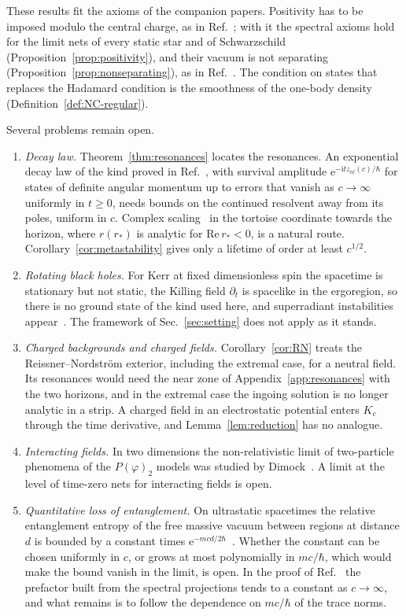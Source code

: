 \documentclass[%
 aip,
 jmp,
 amsmath,amssymb,
 reprint, onecolumn
]{revtex4-1}
\theoremstyle{definition}
\theoremstyle{remark}
\newcommand{\rmi}{\mathrm{i}}
\newcommand{\rme}{\mathrm{e}}
\begin{document}
These results fit the axioms of the companion papers. Positivity has to
be imposed modulo the central charge, as in
Ref.~;
with it the spectral axioms hold for the limit nets of every static
star and of Schwarzschild (Proposition~\ref{prop:positivity}), and their
vacuum is not separating (Proposition~\ref{prop:nonseparating}), as in
Ref.~. The
condition on states that replaces the Hadamard condition is the
smoothness of the one-body density (Definition~\ref{def:NC-regular}).

Several problems remain open.
\begin{enumerate}
\item \emph{Decay law.} Theorem~\ref{thm:resonances} locates the
resonances. An exponential decay law of the kind proved in
Ref.~, with survival amplitude
$\rme^{-\rmi tz_{nl}(c)/\hbar}$ for states of definite angular momentum up
to errors that vanish as $c\to\infty$ uniformly in $t\geq0$, needs bounds
on the continued resolvent away from its poles, uniform in $c$. Complex
scaling~\cite{Simon1973} in the tortoise coordinate towards the horizon, where $r(r_*)$ is
analytic for $\mathrm{Re}\,r_*<0$, is a natural route. Corollary~\ref{cor:metastability}
gives only a lifetime of order at least $c^{1/2}$.
\item \emph{Rotating black holes.} For Kerr at fixed dimensionless spin
the spacetime is stationary but not static, the Killing field
$\partial_t$ is spacelike in the ergoregion, so there is no ground state
of the kind used here, and superradiant instabilities
appear~\cite{BritoCardosoPani2020}. The framework of
Sec.~\ref{sec:setting} does not apply as it stands.
\item \emph{Charged backgrounds and charged fields.}
Corollary~\ref{cor:RN} treats the Reissner--Nordstr\"om exterior,
including the extremal case, for a neutral field. Its resonances would
need the near zone of Appendix~\ref{app:resonances} with the two
horizons, and in the extremal case the ingoing solution is no longer
analytic in a strip. A charged field in an
electrostatic potential enters $K_c$ through the time derivative, and
Lemma~\ref{lem:reduction} has no analogue.
\item \emph{Interacting fields.} In two dimensions the non-relativistic
limit of two-particle phenomena of the $P(\varphi)_2$ models was studied
by Dimock~\cite{Dimock1977}. A limit at the level of time-zero nets for
interacting fields is open.
\item \emph{Quantitative loss of entanglement.} On ultrastatic
spacetimes the relative entanglement entropy of the free massive vacuum
between regions at distance $d$ is bounded by a constant times
$\rme^{-mcd/2\hbar}$~\cite{HollandsSanders2018}. Whether the constant can
be chosen uniformly in $c$, or grows at most polynomially in $mc/\hbar$,
which would make the bound vanish in the limit, is open. In the proof of
Ref.~ the prefactor built from the
spectral projections tends to a constant as $c\to\infty$, and what remains
is to follow the dependence on $mc/\hbar$ of the trace norms.
\end{enumerate}
\end{document}
